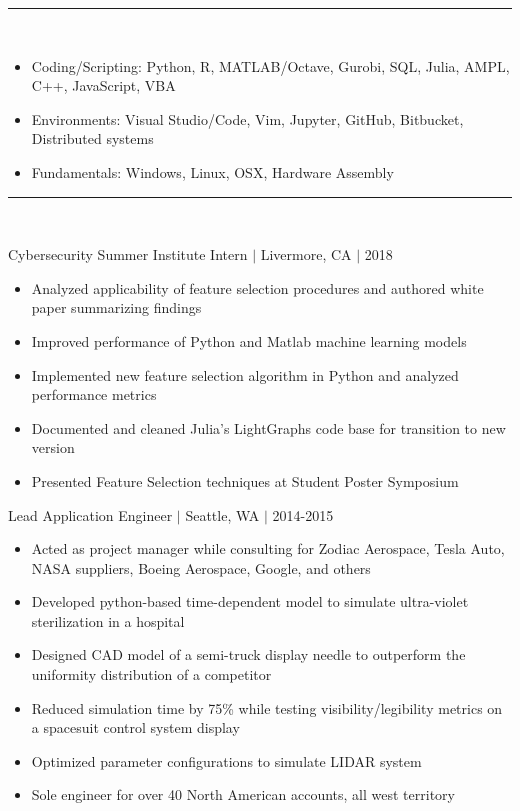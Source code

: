 \documentclass[11pt]{article}
\begin{document}
\vspace{8pt}\hrule\vspace{10pt}
\\
\vspace{-10pt}

\begin{itemize}
\item Coding/Scripting: Python, R, MATLAB/Octave, Gurobi, SQL, Julia, AMPL, C++, JavaScript, VBA
\item Environments: Visual Studio/Code, Vim, Jupyter, GitHub, Bitbucket, Distributed systems
\item Fundamentals: Windows, Linux, OSX, Hardware Assembly
\end{itemize}

\vspace{8pt}\hrule\vspace{10pt}
\\
\vspace{-8pt}

\hfill{Cybersecurity Summer Institute Intern $|$ Livermore, CA $|$ 2018}

\begin{itemize}
\item Analyzed applicability of feature selection procedures and authored white paper summarizing findings
\item Improved performance of Python and Matlab machine learning models
\item Implemented new feature selection algorithm in Python and analyzed performance metrics
\item Documented and cleaned Julia's LightGraphs code base for transition to new version
\item Presented Feature Selection techniques at Student Poster Symposium
\end{itemize}

\hfill { Lead Application Engineer $|$ Seattle, WA $|$ 2014-2015}

\begin{itemize}
\item Acted as project manager while consulting for Zodiac Aerospace, Tesla Auto, NASA suppliers, Boeing Aerospace, Google, and others
\item Developed python-based time-dependent model to simulate ultra-violet sterilization in a hospital
\item Designed CAD model of a semi-truck display needle to outperform the uniformity distribution of a competitor
\item Reduced simulation time by 75\% while testing visibility/legibility metrics on a spacesuit control system display
\item Optimized parameter configurations to simulate LIDAR system
\item Sole engineer for over 40 North American accounts, all west territory
\end{itemize}
\end{document}
